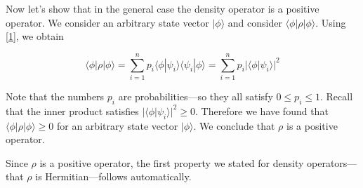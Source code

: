 \documentclass[12pt]{article}
\begin{document}
Now let's show that in the general case the density operator is a positive operator. We consider an arbitrary state vector \( |\phi\rangle \) and consider \( \langle \phi | \rho | \phi \rangle \). Using \ref{1}, we obtain

\[
\langle \phi | \rho | \phi \rangle = \sum_{i=1}^{n} p_i \langle \phi | \psi_i \rangle \langle \psi_i | \phi \rangle = \sum_{i=1}^{n} p_i |\langle \phi | \psi_i \rangle|^2
\]

Note that the numbers \( p_i \) are probabilities—so they all satisfy \( 0 \leq p_i \leq 1 \). Recall that the inner product satisfies \( |\langle \phi | \psi_i \rangle|^2 \geq 0 \). Therefore we have found that \( \langle \phi | \rho | \phi \rangle \geq 0 \) for an arbitrary state vector \( |\phi\rangle \). We conclude that \( \rho \) is a positive operator.

Since \( \rho \) is a positive operator, the first property we stated for density operators—that \( \rho \) is Hermitian—follows automatically.
\end{document}
